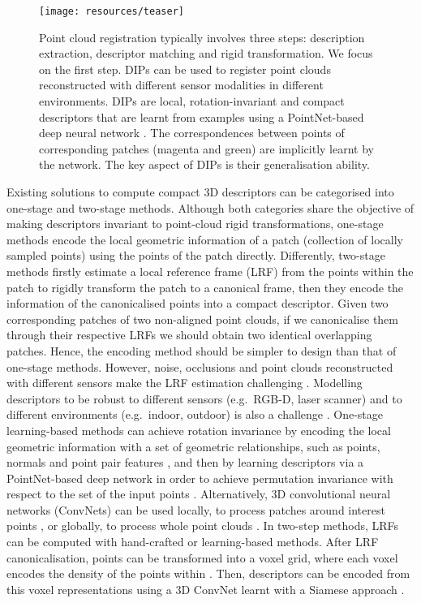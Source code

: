 \documentclass[a4paper,conference]{IEEEtran}
\begin{document}
\begin{figure}[t]
  \centering
  \texttt{[image: resources/teaser]}
  \vspace{-6mm}
  \caption{
  Point cloud registration typically involves three steps: description extraction, descriptor matching and rigid transformation. 
  We focus on the first step.
  DIPs can be used to register point clouds reconstructed with different sensor modalities in different environments. 
  DIPs are local, rotation-invariant and compact descriptors that are learnt from examples using a PointNet-based deep neural network \cite{Qi2017a}. 
  The correspondences between points of corresponding patches (magenta and green) are implicitly learnt by the network. 
  The key aspect of DIPs is their generalisation ability.}
  \label{fig:teaser}
\end{figure}


Existing solutions to compute compact 3D descriptors can be categorised into one-stage \cite{Rusu2009,Zeng2017,Deng2018cvpr,Choy2019,Bai2020} and two-stage \cite{Johnson1999,Salti2014,Gojcic2019} methods.
Although both categories share the objective of making descriptors invariant to point-cloud rigid transformations, one-stage methods encode the local geometric information of a patch (collection of locally sampled points) using the points of the patch directly.
Differently, two-stage methods firstly estimate a local reference frame (LRF) from the points within the patch to rigidly transform the patch to a canonical frame, then they encode the information of the canonicalised points into a compact descriptor.
Given two corresponding patches of two non-aligned point clouds, if we canonicalise them through their respective LRFs we should obtain two identical overlapping patches.
Hence, the encoding method should be simpler to design than that of one-stage methods.
However, noise, occlusions and point clouds reconstructed with different sensors make the LRF estimation challenging \cite{Melzi2019,Zhu2020}.
Modelling descriptors to be robust to different sensors (e.g.~RGB-D, laser scanner) and to different environments (e.g.~indoor, outdoor) is also a challenge \cite{Gojcic2019,Bai2020}.
One-stage learning-based methods can achieve rotation invariance by encoding the local geometric information with a set of geometric relationships, such as points, normals and point pair features \cite{Deng2018cvpr}, and then by learning descriptors via a PointNet-based deep network in order to achieve permutation invariance with respect to the set of the input points \cite{Qi2017a}.
Alternatively, 3D convolutional neural networks (ConvNets) can be used locally, to process patches around interest points \cite{Zeng2017}, or globally, to process whole point clouds \cite{Choy2019}.
In two-step methods, LRFs can be computed with hand-crafted \cite{Yang2016} or learning-based \cite{Melzi2019} methods.
After LRF canonicalisation, points can be transformed into a voxel grid, where each voxel encodes the density of the points within \cite{Gojcic2019}.
Then, descriptors can be encoded from this voxel representations using a 3D ConvNet learnt with a Siamese approach \cite{Tian2017}.
\end{document}
